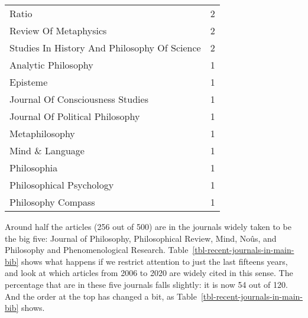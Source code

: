 \documentclass[
  10pt,
  letterpaper,
  DIV=11,
  numbers=noendperiod,
  twoside]{scrartcl}
\begin{document}
\begin{longtable}[]{@{}lr@{}}
Ratio & 2 \\
Review Of Metaphysics & 2 \\
Studies In History And Philosophy Of Science & 2 \\
Analytic Philosophy & 1 \\
Episteme & 1 \\
Journal Of Consciousness Studies & 1 \\
Journal Of Political Philosophy & 1 \\
Metaphilosophy & 1 \\
Mind \& Language & 1 \\
Philosophia & 1 \\
Philosophical Psychology & 1 \\
Philosophy Compass & 1 \\

\end{longtable}

Around half the articles (256 out of 500) are in the journals widely
taken to be the big five: Journal of Philosophy, Philosophical Review,
Mind, Noûs, and Philosophy and Phenomenological Research.
Table~\ref{tbl-recent-journals-in-main-bib} shows what happens if we
restrict attention to just the last fifteens years, and look at which
articles from 2006 to 2020 are widely cited in this sense. The
percentage that are in these five journals falls slightly: it is now 54
out of 120. And the order at the top has changed a bit, as
Table~\ref{tbl-recent-journals-in-main-bib} shows.
\end{document}
